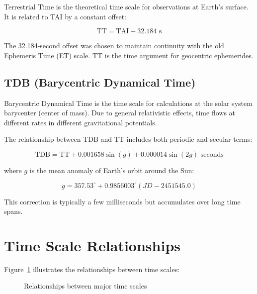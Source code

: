 Terrestrial Time is the theoretical time scale for observations at Earth's surface. It is related to TAI by a constant offset:

\begin{equation}
\text{TT} = \text{TAI} + 32.184 \text{ s}
\end{equation}

The 32.184-second offset was chosen to maintain continuity with the old Ephemeris Time (ET) scale. TT is the time argument for geocentric ephemerides.

\subsection{TDB (Barycentric Dynamical Time)}

Barycentric Dynamical Time is the time scale for calculations at the solar system barycenter (center of mass). Due to general relativistic effects, time flows at different rates in different gravitational potentials.

The relationship between TDB and TT includes both periodic and secular terms:

\begin{equation}
\text{TDB} = \text{TT} + 0.001658 \sin(g) + 0.000014 \sin(2g) \text{ seconds}
\end{equation}

where $g$ is the mean anomaly of Earth's orbit around the Sun:

\begin{equation}
g = 357.53^\circ + 0.9856003^\circ(JD - 2451545.0)
\end{equation}

This correction is typically a few milliseconds but accumulates over long time spans.

\section{Time Scale Relationships}

Figure~\ref{fig:timescales} illustrates the relationships between time scales:

\begin{figure}[H]
\centering
{}
\caption{Relationships between major time scales}
\label{fig:timescales}
\end{figure}

